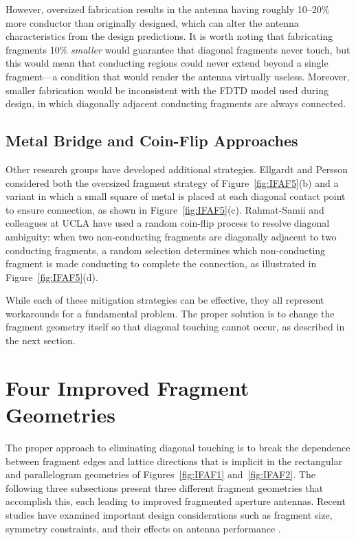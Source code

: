 However, oversized fabrication results in the antenna having roughly 10--20\% more conductor than originally designed, which can alter the antenna characteristics from the design predictions.  It is worth noting that fabricating fragments 10\% \emph{smaller} would guarantee that diagonal fragments never touch, but this would mean that conducting regions could never extend beyond a single fragment---a condition that would render the antenna virtually useless.  Moreover, smaller fabrication would be inconsistent with the FDTD model used during design, in which diagonally adjacent conducting fragments are always connected.

\subsection{Metal Bridge and Coin-Flip Approaches}

Other research groups have developed additional strategies.  Ellgardt and Persson \cite{EllgardtPersson} considered both the oversized fragment strategy of Figure~\ref{fig:IFAF5}(b) and a variant in which a small square of metal is placed at each diagonal contact point to ensure connection, as shown in Figure~\ref{fig:IFAF5}(c).  Rahmat-Samii and colleagues at UCLA have used a random coin-flip process to resolve diagonal ambiguity: when two non-conducting fragments are diagonally adjacent to two conducting fragments, a random selection determines which non-conducting fragment is made conducting to complete the connection, as illustrated in Figure~\ref{fig:IFAF5}(d).

While each of these mitigation strategies can be effective, they all represent workarounds for a fundamental problem.  The proper solution is to change the fragment geometry itself so that diagonal touching cannot occur, as described in the next section.

\section{Four Improved Fragment Geometries}
\label{sec:IFAS4}

The proper approach to eliminating diagonal touching is to break the dependence between fragment edges and lattice directions that is implicit in the rectangular and parallelogram geometries of Figures~\ref{fig:IFAF1} and~\ref{fig:IFAF2}.  The following three subsections present three different fragment geometries that accomplish this, each leading to improved fragmented aperture antennas.  Recent studies have examined important design considerations such as fragment size, symmetry constraints, and their effects on antenna performance \cite{Mair2024Design}.


